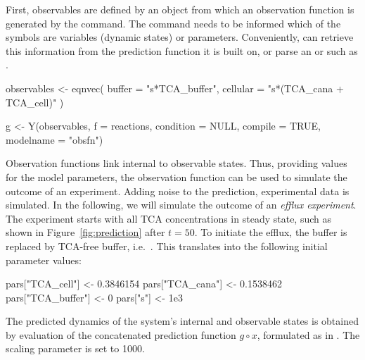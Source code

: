 \documentclass[article]{jss}
\begin{document}
First, observables are defined by an  object from which an observation function  is generated by the  command. The  command needs to be informed which of the symbols are variables (dynamic states) or parameters. Conveniently,  can retrieve this information from the prediction function  it is built on, or parse an  or  such as .
\begin{CodeChunk}
\begin{CodeInput}
  observables <- eqnvec(
    buffer = "s*TCA_buffer",
    cellular = "s*(TCA_cana + TCA_cell)"
  )
  
  g <- Y(observables, f = reactions, condition = NULL,
         compile = TRUE, modelname = "obsfn")
\end{CodeInput}
\end{CodeChunk}
Observation functions link internal to observable states. Thus, providing values for the model parameters, the observation function can be used to simulate the outcome of an experiment. Adding noise to the prediction, experimental data is simulated.
In the following, we will simulate the outcome of an \textit{efflux experiment}.
The experiment starts with all TCA concentrations in steady state, such as shown in Figure~\ref{fig:prediction} after $t = 50$. To initiate the efflux, the buffer is replaced by TCA-free buffer, i.e.~. This translates into the following initial parameter values:
\begin{CodeChunk}
\begin{CodeInput}
  pars["TCA_cell"] <- 0.3846154
  pars["TCA_cana"] <- 0.1538462
  pars["TCA_buffer"] <- 0
  pars["s"] <- 1e3
\end{CodeInput}
\end{CodeChunk}
The predicted dynamics of the system's internal and observable states is obtained by evaluation of the concatenated prediction function $g\circ x$, formulated as  in . The scaling parameter  is set to 1000.
\end{document}
